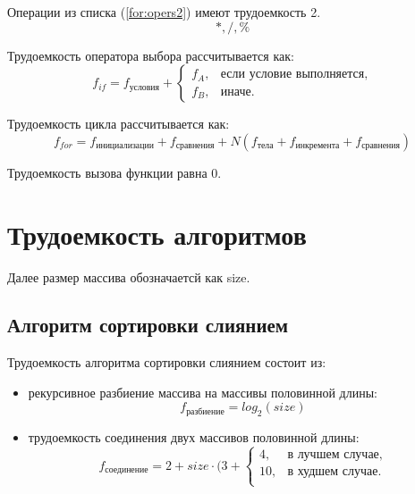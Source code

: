 Операции из списка (\ref{for:opers2}) имеют трудоемкость 2.
\begin{equation}
	\label{for:opers2}
	*, /, \%
\end{equation}

Трудоемкость оператора выбора  рассчитывается как:
\begin{equation}
	\label{for:if}
	f_{if} = f_{\text{условия}} +
	\begin{cases}
		f_A, & \text{если условие выполняется,}\\
		f_B, & \text{иначе.}
	\end{cases}
\end{equation}

Трудоемкость цикла рассчитывается как:
\begin{equation}
	\label{for:for}
	f_{for} = f_{\text{инициализации}} + f_{\text{сравнения}} + N(f_{\text{тела}} + f_{\text{инкремента}} + f_{\text{сравнения}})
\end{equation}

Трудоемкость вызова функции равна 0.

\section{Трудоемкость алгоритмов}
Далее размер массива обозначаетсй как size.

\subsection{Алгоритм сортировки слиянием}
Трудоемкость алгоритма сортировки слиянием состоит из:

\begin{itemize}
	\item рекурсивное разбиение массива на массивы половинной длины:
	\begin{equation}
		\label{worst_counting}
		f_{\text{разбиение}} = log_2{(size)}
	\end{equation}
	
	\item трудоемкость соединения двух массивов половинной длины:
	\begin{equation}
		\label{worst_counting}
		f_{\text{соединение}} = 2 + size \cdot (3 + \begin{cases}
			4, & \text{в лучшем случае},\\
			10, & \text{в худшем случае}.\\
		\end{cases}
	\end{equation}
\end{itemize}

